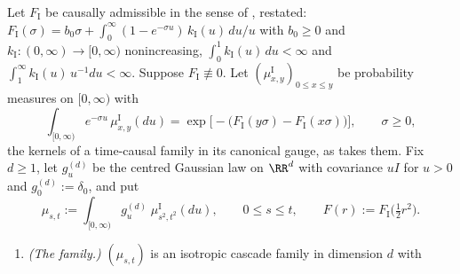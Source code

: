 \begin{proposition}
\label{prop:isotropic-bridge}
\leanok
Let $F_{\mathrm I}$ be causally admissible in the sense of , restated:
$F_{\mathrm I}(\sigma) = b_0\sigma + \int_0^\infty(1 - e^{-\sigma u})\,k_{\mathrm I}(u)\,du/u$ with
$b_0 \ge 0$ and $k_{\mathrm I} : (0,\infty) \to [0,\infty)$ nonincreasing,
$\int_0^1 k_{\mathrm I}(u)\,du < \infty$ and $\int_1^\infty k_{\mathrm I}(u)\,u^{-1}du < \infty$.
Suppose $F_{\mathrm I} \not\equiv 0$. Let $(\mu^{\mathrm I}_{x,y})_{0 \le x \le y}$ be probability
measures on $[0,\infty)$ with
\[
  \int_{[0,\infty)} e^{-\sigma u}\,\mu^{\mathrm I}_{x,y}(du)
   = \exp\bigl[-\bigl(F_{\mathrm I}(y\sigma) - F_{\mathrm I}(x\sigma)\bigr)\bigr], \qquad \sigma \ge 0 ,
\]
the kernels of a time-causal family in its canonical gauge, as  takes them. Fix
$d \ge 1$, let $g^{(d)}_u$ be the centred Gaussian law on $\RR^d$ with covariance $uI$ for $u > 0$
and $g^{(d)}_0 := \delta_0$, and put
\begin{equation}\label{eq:isotropic-bridge}
  \mu_{s,t} := \int_{[0,\infty)} g^{(d)}_u\;\mu^{\mathrm I}_{s^2,t^2}(du), \qquad 0 \le s \le t,
  \qquad F(r) := F_{\mathrm I}\bigl(\tfrac12 r^2\bigr) .
\end{equation}
\begin{enumerate}
\item \emph{(The family.)} $(\mu_{s,t})$ is an isotropic cascade family in dimension $d$ with

\end{enumerate}
\end{proposition}
